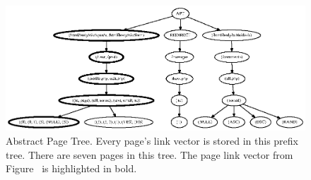 \begin{figure}[tb]
  \centering
  \includegraphics{figures/abstract_page_tree.ps}
  \caption[Abstract Page Tree example.]{Abstract Page Tree. Every page's link vector is stored
    in this prefix tree. There are seven pages in this tree. The page link vector
    from Figure~ is highlighted in bold.}
\end{figure}

